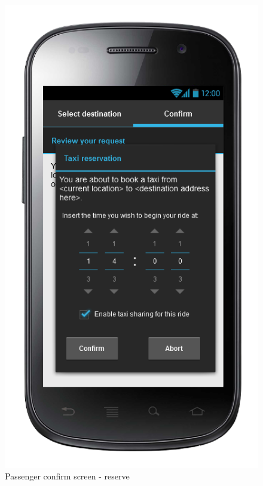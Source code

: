 \begin{figure} [h]
\centering
  	  \includegraphics[scale=0.5]{ui/Passenger confirm screen - reserve.png}
\caption{Passenger confirm screen -  reserve}
  
	\end{figure}
